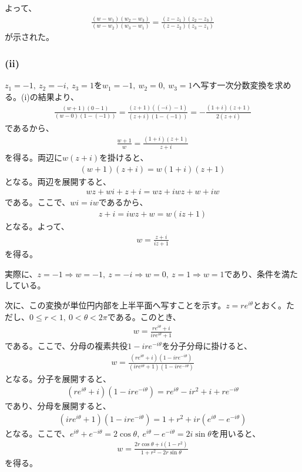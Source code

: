 \documentclass[platex,dvipdfmx,a4paper]{jsarticle}
\begin{document}
  よって、
  \begin{align*}
    \frac{(w-w_1)(w_2-w_3)}{(w-w_2)(w_3-w_1)}=\frac{(z-z_1)(z_2-z_3)}{(z-z_2)(z_3-z_1)}
  \end{align*}
  が示された。

  \subsubsection*{(ii)}

  $z_1=-1,\ z_2=-i,\ z_3=1$を$w_1=-1,\ w_2=0,\ w_3=1$へ写す一次分数変換を求める。(i)の結果より、
  \begin{align*}
    \frac{(w+1)(0-1)}{(w-0)(1-(-1))}=\frac{(z+1)((-i)-1)}{(z+i)(1-(-1))}=-\frac{(1+i)(z+1)}{2(z+i)}
  \end{align*}
  であるから、
  \begin{align*}
    \frac{w+1}{w}=\frac{(1+i)(z+1)}{z+i}
  \end{align*}
  を得る。両辺に$w(z+i)$を掛けると、
  \begin{align*}
    (w+1)(z+i)=w(1+i)(z+1)
  \end{align*}
  となる。両辺を展開すると、
  \begin{align*}
    wz+wi+z+i=wz+iwz+w+iw
  \end{align*}
  である。ここで、$wi=iw$であるから、
  \begin{align*}
    z+i=iwz+w=w(iz+1)
  \end{align*}
  となる。よって、
  \begin{align*}
    w=\frac{z+i}{iz+1}
  \end{align*}
  を得る。

  実際に、$z=-1\Rightarrow w=-1,\ z=-i\Rightarrow w=0,\ z=1\Rightarrow w=1$であり、条件を満たしている。

  次に、この変換が単位円内部を上半平面へ写すことを示す。$z=re^{i\theta}$とおく。ただし、$0\le r<1,\ 0<\theta<2\pi$である。このとき、
  \begin{align*}
    w=\frac{re^{i\theta}+i}{ire^{i\theta}+1}
  \end{align*}
  である。ここで、分母の複素共役$1-ire^{-i\theta}$を分子分母に掛けると、
  \begin{align*}
    w=\frac{(re^{i\theta}+i)(1-ire^{-i\theta})}{(ire^{i\theta}+1)(1-ire^{-i\theta})}
  \end{align*}
  となる。分子を展開すると、
  \begin{align*}
    (re^{i\theta}+i)(1-ire^{-i\theta})=re^{i\theta}-ir^2+i+re^{-i\theta}
  \end{align*}
  であり、分母を展開すると、
  \begin{align*}
    (ire^{i\theta}+1)(1-ire^{-i\theta})=1+r^2+ir(e^{i\theta}-e^{-i\theta})
  \end{align*}
  となる。ここで、$e^{i\theta}+e^{-i\theta}=2\cos\theta,\ e^{i\theta}-e^{-i\theta}=2i\sin\theta$を用いると、
  \begin{align*}
    w=\frac{2r\cos\theta+i(1-r^2)}{1+r^2-2r\sin\theta}
  \end{align*}
  を得る。
\end{document}
